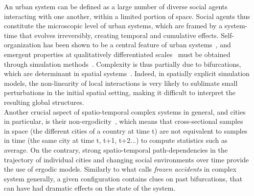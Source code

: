 \documentclass[Royal,sageh,times]{sagej}
\begin{document}
An urban system can be defined as a large number of diverse social agents interacting with one another, within a limited portion of space. Social agents thus constitute the microscopic level of urban systems, which are framed by a system-time that evolves irreversibly, creating temporal and cumulative effects. Self-organization has been shown to be a central feature of urban systems~\citep{AllenSanglier1981,saint1989villes, Portugali2000}, and emergent properties at qualitatively differentiated scales~\citep{pumain2006hierarchy, AzizAlaouiBertelle2009} must be obtained through simulation methods~\citep{Wu2002, Batty2007}. Complexity is thus partially due to bifurcations, which are determinant in spatial systems~\citep{Wilson1981, Wilson2002}. Indeed, in spatially explicit simulation models, the non-linearity of local interactions is very likely to sublimate small perturbations in the initial spatial setting, making it difficult to interpret the resulting global structures. \\
Another crucial aspect of spatio-temporal complex systems in general, and cities in particular, is their non-ergodicity~\citep{pumain2012urban}, which means that cross-sectional samples in space (the different cities of a country at time t) are not equivalent to samples in time (the same city at time t, t+1, t+2...) to compute statistics such as average. On the contrary, strong spatio-temporal path-dependencies in the trajectory of individual cities and changing social environments over time provide the use of ergodic models. Similarly to what \citet{gell1995quark} calls \emph{frozen accidents} in complex system generally, a given configuration contains clues on past bifurcations, that can have had dramatic effects on the state of the system. \\
\end{document}
